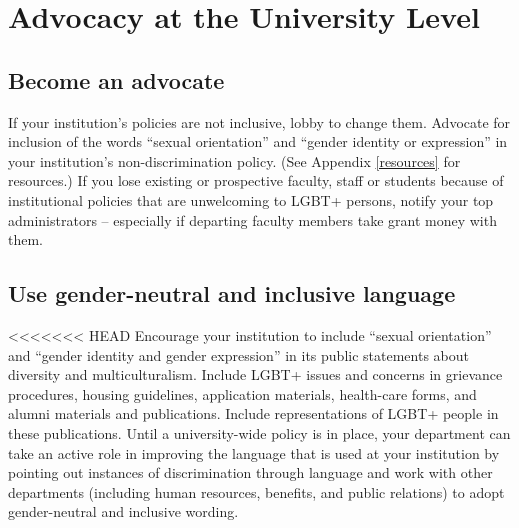 %

\chapter{Advocacy at the University Level}	%
\label{univ-advocacy}		%
\normalsize			%


\section {Become an advocate}
\label{become-advocate}
If your institution's policies are not inclusive, lobby to change them.  Advocate for inclusion of the words ``sexual orientation'' and ``gender identity or expression'' in your institution's non-discrimination policy.  (See Appendix \ref{resources} for resources.)  If you lose existing or prospective faculty, staff or students because of institutional policies that are unwelcoming to LGBT+ persons, notify your top administrators -- especially if departing faculty members take grant money with them.


\section {Use gender-neutral and inclusive language}
\label{univ-language}
<<<<<<< HEAD
Encourage your institution to include ``sexual orientation'' and ``gender identity and gender expression'' in its public statements about diversity and multiculturalism.  Include LGBT+ issues and concerns in grievance procedures, housing guidelines, application materials, health-care forms, and alumni materials and publications.  Include representations of LGBT+ people in these publications.  Until a university-wide policy is in place, your department can take an active role in improving the language that is used at your institution by pointing out instances of discrimination through language and work with other departments (including human resources, benefits, and public relations) to adopt gender-neutral and inclusive wording.


